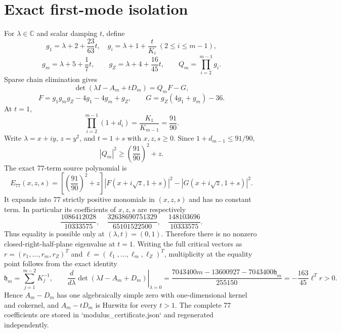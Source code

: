 \section*{Exact first-mode isolation}
For $\lambda\in\mathbb C$ and scalar damping $t$, define
\[
g_1=\lambda+2+\frac{23}{63}t,
\quad
g_i=\lambda+1+\frac{t}{K_i}\ (2\le i\le m-1),
\]
\[
g_m=\lambda+5+\frac17t,
\qquad
g_Z=\lambda+4+\frac{16}{45}t,
\qquad
Q_m=\prod_{i=2}^{m-1}g_i.
\]
Sparse chain elimination gives
\[
\det(\lambda I-A_m+tD_m)=Q_mF-G,
\]
\[
F=g_1g_mg_Z-4g_1-4g_m+g_Z,
\qquad
G=g_Z(4g_1+g_m)-36.
\]
At $t=1$,
\[
\prod_{i=2}^{m-1}(1+d_i)=\frac{K_1}{K_{m-1}}=\frac{91}{90}.
\]
Write $\lambda=x+iy$, $z=y^2$, and $t=1+s$ with $x,z,s\ge0$.  Since
$1+d_{m-1}\le91/90$,
\[
|Q_m|^2\ge\left(\frac{91}{90}\right)^2+z.
\]
The exact 77-term source polynomial is
\[
E_{77}(x,z,s)=
\left[\left(\frac{91}{90}\right)^2+z\right]
|F(x+i\sqrt z,1+s)|^2-|G(x+i\sqrt z,1+s)|^2.
\]
It expands into 77 strictly positive monomials in $(x,z,s)$ and has no constant
term.  In particular its coefficients of $x,z,s$ are respectively
\[
\frac{1086412028}{10333575},
\quad
\frac{32638690751329}{65101522500},
\quad
\frac{148103696}{10333575}.
\]
Thus equality is possible only at $(\lambda,t)=(0,1)$.  Therefore
there is no nonzero closed-right-half-plane eigenvalue at $t=1$.  Writing the
full critical vectors as $r=(r_1,\ldots,r_m,r_Z)^T$ and
$\ell=(\ell_1,\ldots,\ell_m,\ell_Z)^T$, multiplicity at the equality point
follows from the exact identity
\[
 \mathfrak h_m=\sum_{j=1}^{m-2}K_j^{-1},\qquad
 \left.\frac{d}{d\lambda}\det(\lambda I-A_m+D_m)\right|_{\lambda=0}
 =\frac{7043400m-13600927-7043400\mathfrak h_m}{255150}
 =-\frac{163}{45}\ell^Tr>0.
\]
Hence $A_m-D_m$ has one algebraically simple zero with one-dimensional kernel
and cokernel, and $A_m-tD_m$ is Hurwitz for every $t>1$.  The complete 77 coefficients are
stored in `modulus_certificate.json` and regenerated independently.
